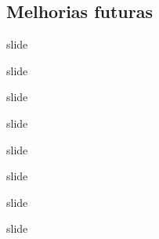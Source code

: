 \documentclass[ucs,8pt]{beamer}
\begin{document}
\subsection{Melhorias futuras}
\begin{frame}{slide}


\end{frame}



\begin{frame}{slide}


\end{frame}



\begin{frame}{slide}


\end{frame}



\begin{frame}{slide}


\end{frame}



\begin{frame}{slide}


\end{frame}



\begin{frame}{slide}


\end{frame}



\begin{frame}{slide}


\end{frame}



\begin{frame}{slide}


\end{frame}
\end{document}
